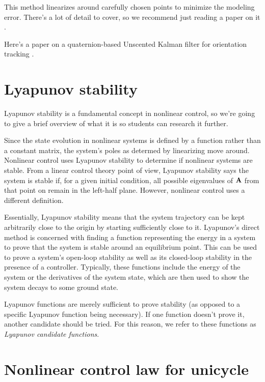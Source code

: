 This method linearizes around carefully chosen points to minimize the modeling
error. There's a lot of detail to cover, so we recommend just reading a paper on
it \cite{bib:unscented-kalman-filter}.

Here's a paper on a quaternion-based Unscented Kalman filter for orientation
tracking \cite{bib:ukf-state-tracking}.

\section{Lyapunov stability}

Lyapunov stability is a fundamental concept in nonlinear control, so we're going
to give a brief overview of what it is so students can research it further.

Since the state evolution in nonlinear systems is defined by a function rather
than a constant matrix, the system's poles as determed by linearizing move
around. Nonlinear control uses Lyapunov stability to determine if nonlinear
systems are stable. From a linear control theory point of view, Lyapunov
stability says the system is stable if, for a given initial condition, all
possible eigenvalues of $\mathbf{A}$ from that point on remain in the left-half
plane. However, nonlinear control uses a different definition.

Essentially, Lyapunov stability means that the system trajectory can be kept
arbitrarily close to the origin by starting sufficiently close to it. Lyapunov's
direct method is concerned with finding a function representing the energy in a
system to prove that the system is stable around an equilibrium point. This can
be used to prove a system's open-loop stability as well as its closed-loop
stability in the presence of a controller. Typically, these functions include
the energy of the system or the derivatives of the system state, which are then
used to show the system decays to some ground state.

Lyapunov functions are merely sufficient to prove stability (as opposed to a
specific Lyapunov function being necessary). If one function doesn't prove it,
another candidate should be tried. For this reason, we refer to these functions
as \textit{Lyapunov candidate functions}.

\section{Nonlinear control law for unicycle}

